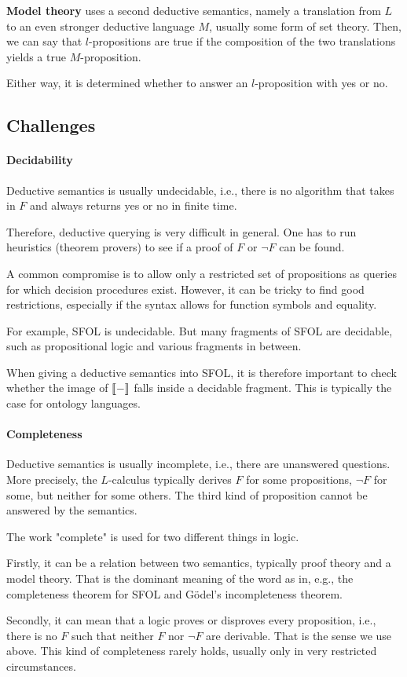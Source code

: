 \textbf{Model theory} uses a second deductive semantics, namely a translation from $L$ to an even stronger deductive language $M$, usually some form of set theory.
Then, we can say that $l$-propositions are true if the composition of the two translations yields a true $M$-proposition.

Either way, it is determined whether to answer an $l$-proposition with yes or no.

\subsection{Challenges}

\paragraph{Decidability}
Deductive semantics is usually undecidable, i.e., there is no algorithm that takes in $F$
and always returns yes or no in finite time. 

Therefore, deductive querying is very difficult in general.
One has to run heuristics (theorem provers) to see if a proof of $F$ or $\neg F$ can be found.

A common compromise is to allow only a restricted set of propositions as queries for which decision procedures exist.
However, it can be tricky to find good restrictions, especially if the syntax allows for function symbols and equality.

For example, SFOL is undecidable.
But many fragments of SFOL are decidable, such as propositional logic and various fragments in between.

When giving a deductive semantics into SFOL, it is therefore important to check whether the image of $\llbracket -\rrbracket$ falls inside a decidable fragment.
This is typically the case for ontology languages.

\paragraph{Completeness}
Deductive semantics is usually incomplete, i.e., there are unanswered questions.
More precisely, the $L$-calculus typically derives $F$ for some propositions, $\neg F$ for some, but neither for some others.
The third kind of proposition cannot be answered by the semantics.

\begin{remark}
The work "complete" is used for two different things in logic.

Firstly, it can be a relation between two semantics, typically proof theory and a model theory.
That is the dominant meaning of the word as in, e.g., the completeness theorem for SFOL and G\"odel's incompleteness theorem.

Secondly, it can mean that a logic proves or disproves every proposition, i.e., there is no $F$ such that neither $F$ nor $\neg F$ are derivable.
That is the sense we use above.
This kind of completeness rarely holds, usually only in very restricted circumstances.
\end{remark}

